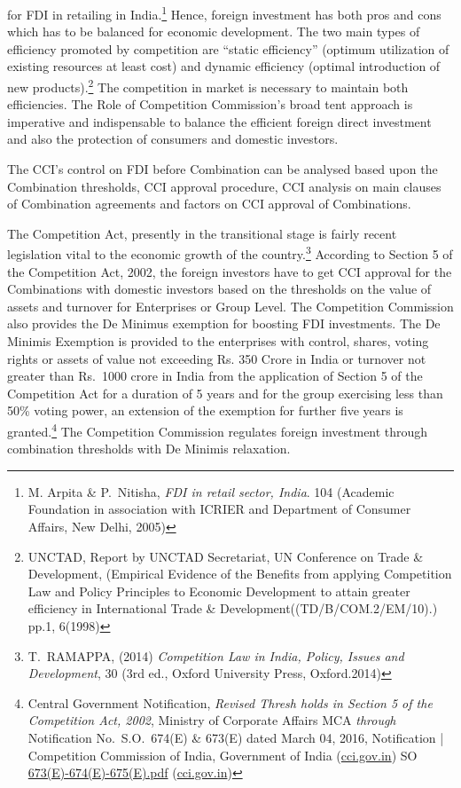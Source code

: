 \begin{multicols}{2}
for FDI in retailing in India.\footnote{M. Arpita \& P.\ Nitisha, \textit{FDI in retail sector, India}. 104 (Academic Foundation in association with ICRIER and
Department of Consumer Affairs, New Delhi, 2005)} Hence, foreign investment has both pros and cons which has to
be balanced for economic development. The two main types of efficiency promoted by
competition are “static efficiency” (optimum utilization of existing resources at least cost)
and dynamic efficiency (optimal introduction of new products).\footnote{UNCTAD, Report by UNCTAD Secretariat, UN Conference on Trade \& Development, (Empirical Evidence
of the Benefits from applying Competition Law and Policy Principles to Economic Development to attain
greater efficiency in International Trade \& Development((TD/B/COM.2/EM/10).) pp.1, 6(1998)} The competition in market
is necessary to maintain both efficiencies. The Role of Competition Commission's broad tent
approach is imperative and indispensable to balance the efficient foreign direct investment
and also the protection of consumers and domestic investors.

\vspace{.5cm}


\noi
The CCI’s control on FDI before Combination can be analysed based upon the Combination
thresholds, CCI approval procedure, CCI analysis on main clauses of Combination
agreements and factors on CCI approval of Combinations.


\noi
The Competition Act, presently in the transitional stage is fairly recent legislation vital to the
economic growth of the country.\footnote{T.\ RAMAPPA, (2014) \textit{Competition Law in India, Policy, Issues and Development}, 30 (3rd ed., Oxford
University Press, Oxford.2014)} According to Section 5 of the Competition Act, 2002, the
foreign investors have to get CCI approval for the Combinations with domestic investors
based on the thresholds on the value of assets and turnover for Enterprises or Group Level.
The Competition Commission also provides the De Minimus exemption for boosting FDI
investments. The De Minimis Exemption is provided to the enterprises with control, shares,
voting rights or assets of value not exceeding Rs. 350 Crore in India or turnover not greater
than Rs.\ 1000 crore in India from the application of Section 5 of the Competition Act for a
duration of 5 years and for the group exercising less than 50\% voting power, an extension of
the exemption for further five years is granted.\footnote{Central Government Notification, \textit{Revised Thresh holds in Section 5 of the Competition Act, 2002}, Ministry of
Corporate Affairs MCA \textit{through} Notification No.\ S.O.\ 674(E) \& 673(E) dated March 04, 2016, Notification |
Competition Commission of India, Government of India (\url{cci.gov.in}) SO \url{673(E)-674(E)-675(E).pdf} (\url{cci.gov.in})} The Competition Commission regulates
foreign investment through combination thresholds with De Minimis relaxation.


\end{multicols}
